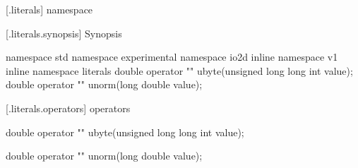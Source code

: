  [\iotwod.literals] { namespace}

 [\iotwod.literals.synopsis] { Synopsis}

\begin{codeblock}
namespace std { namespace experimental { namespace io2d { inline namespace v1 {
  inline namespace literals {
    double operator "" ubyte(unsigned long long int value);
    double operator "" unorm(long double value);
  }
} } } }
\end{codeblock}

 [\iotwod.literals.operators] { operators}

%
%
\begin{itemdecl}
double operator "" ubyte(unsigned long long int value);
\end{itemdecl}
\begin{itemdescr}
	\pnum
	\returns
\end{itemdescr}

%
%
\begin{itemdecl}
double operator "" unorm(long double value);
\end{itemdecl}
\begin{itemdescr}
	\pnum
	\returns
\end{itemdescr}
